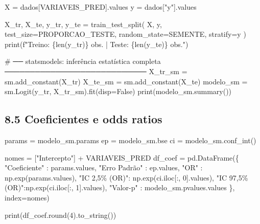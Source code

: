 \documentclass[
  letterpaper,
  DIV=11,
  numbers=noendperiod]{scrartcl}
\newenvironment{Shaded}{\begin{snugshade}}{\end{snugshade}}
\newcommand{\BuiltInTok}[1]{\textcolor[rgb]{0.00,0.23,0.31}{#1}}
\newcommand{\CommentTok}[1]{\textcolor[rgb]{0.37,0.37,0.37}{#1}}
\newcommand{\DecValTok}[1]{\textcolor[rgb]{0.68,0.00,0.00}{#1}}
\newcommand{\NormalTok}[1]{\textcolor[rgb]{0.00,0.23,0.31}{#1}}
\newcommand{\OperatorTok}[1]{\textcolor[rgb]{0.37,0.37,0.37}{#1}}
\newcommand{\SpecialCharTok}[1]{\textcolor[rgb]{0.37,0.37,0.37}{#1}}
\newcommand{\SpecialStringTok}[1]{\textcolor[rgb]{0.13,0.47,0.30}{#1}}
\newcommand{\StringTok}[1]{\textcolor[rgb]{0.13,0.47,0.30}{#1}}
\newcommand{\VariableTok}[1]{\textcolor[rgb]{0.07,0.07,0.07}{#1}}
\begin{document}
\begin{Shaded}
\begin{Highlighting}[]
\NormalTok{X }\OperatorTok{=}\NormalTok{ dados[VARIAVEIS\_PRED].values}
\NormalTok{y }\OperatorTok{=}\NormalTok{ dados[}\StringTok{"y"}\NormalTok{].values}

\NormalTok{X\_tr, X\_te, y\_tr, y\_te }\OperatorTok{=}\NormalTok{ train\_test\_split(}
\NormalTok{    X, y, test\_size}\OperatorTok{=}\NormalTok{PROPORCAO\_TESTE,}
\NormalTok{    random\_state}\OperatorTok{=}\NormalTok{SEMENTE, stratify}\OperatorTok{=}\NormalTok{y}
\NormalTok{)}
\BuiltInTok{print}\NormalTok{(}\SpecialStringTok{f"Treino: }\SpecialCharTok{\{}\BuiltInTok{len}\NormalTok{(y\_tr)}\SpecialCharTok{\}}\SpecialStringTok{ obs.  |  Teste: }\SpecialCharTok{\{}\BuiltInTok{len}\NormalTok{(y\_te)}\SpecialCharTok{\}}\SpecialStringTok{ obs."}\NormalTok{)}

\CommentTok{\# ── statsmodels: inferência estatística completa ────────────────────────────}
\NormalTok{X\_tr\_sm }\OperatorTok{=}\NormalTok{ sm.add\_constant(X\_tr)}
\NormalTok{X\_te\_sm }\OperatorTok{=}\NormalTok{ sm.add\_constant(X\_te)}
\NormalTok{modelo\_sm }\OperatorTok{=}\NormalTok{ sm.Logit(y\_tr, X\_tr\_sm).fit(disp}\OperatorTok{=}\VariableTok{False}\NormalTok{)}
\BuiltInTok{print}\NormalTok{(modelo\_sm.summary())}
\end{Highlighting}
\end{Shaded}

\subsection{8.5 Coeficientes e odds
ratios}\label{coeficientes-e-odds-ratios-1}

\begin{Shaded}
\begin{Highlighting}[]
\NormalTok{params  }\OperatorTok{=}\NormalTok{ modelo\_sm.params}
\NormalTok{ep      }\OperatorTok{=}\NormalTok{ modelo\_sm.bse}
\NormalTok{ci      }\OperatorTok{=}\NormalTok{ modelo\_sm.conf\_int()}

\NormalTok{nomes }\OperatorTok{=}\NormalTok{ [}\StringTok{"Intercepto"}\NormalTok{] }\OperatorTok{+}\NormalTok{ VARIAVEIS\_PRED}
\NormalTok{df\_coef }\OperatorTok{=}\NormalTok{ pd.DataFrame(\{}
    \StringTok{"Coeficiente"}\NormalTok{ : params.values,}
    \StringTok{"Erro Padrão"}\NormalTok{ : ep.values,}
    \StringTok{"OR"}\NormalTok{          : np.exp(params.values),}
    \StringTok{"IC 2,5\% (OR)"}\NormalTok{: np.exp(ci.iloc[:, }\DecValTok{0}\NormalTok{].values),}
    \StringTok{"IC 97,5\% (OR)"}\NormalTok{:np.exp(ci.iloc[:, }\DecValTok{1}\NormalTok{].values),}
    \StringTok{"Valor{-}p"}\NormalTok{     : modelo\_sm.pvalues.values}
\NormalTok{\}, index}\OperatorTok{=}\NormalTok{nomes)}

\BuiltInTok{print}\NormalTok{(df\_coef.}\BuiltInTok{round}\NormalTok{(}\DecValTok{4}\NormalTok{).to\_string())}
\end{Highlighting}
\end{Shaded}
\end{document}
